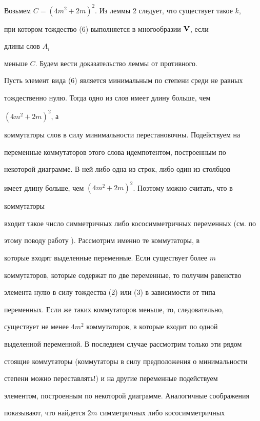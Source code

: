 \begin{pf}


Возьмем $C=(4m^2+2m)^2$. Из леммы 2 следует, что существует такое $k$,


при котором тождество (6) выполняется в многообразии $\bold V$, если


длины слов $A_i$


меньше $C$. Будем вести доказательство леммы от противного.





Пусть элемент вида (6) является минимальным по степени среди не равных


тождественно нулю. Тогда одно из слов имеет длину больше, чем


$(4m^2+2m)^2$, а


коммутаторы слов в силу минимальности перестановочны. Подействуем на


переменные коммутаторов этого слова идемпотентом, построенным по


некоторой диаграмме. В ней либо одна из строк, либо один из столбцов


имеет длину больше, чем $(4m^2+2m)^2$. Поэтому можно считать, что в


коммутаторы


входит такое число симметричных либо кососимметричных переменных (см. по


этому поводу работу \cite{7}). Рассмотрим именно те коммутаторы, в


которые входят выделенные переменные. Если существует более $m$


коммутаторов, которые содержат по две переменные, то получим равенство


элемента нулю в силу тождества (2) или (3) в зависимости от типа


переменных. Если же таких коммутаторов меньше, то, следовательно,


существует не менее $4m^2$ коммутаторов, в которые входит по одной


выделенной переменной. В последнем случае рассмотрим только эти рядом


стоящие коммутаторы (коммутаторы в силу предположения о минимальности


степени можно переставлять!) и на другие переменные подействуем


элементом, построенным по некоторой диаграмме. Аналогичные соображения


показывают, что найдется $2m$ симметричных либо кососимметричных



\end{pf}
